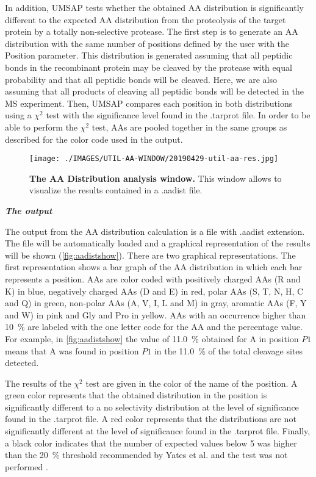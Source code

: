 In addition, UMSAP tests whether the obtained AA distribution is significantly different to the expected AA distribution from the proteolysis of the target protein by a totally non-selective protease. The first step is to generate an AA distribution with the same number of positions defined by the user with the Position parameter. This distribution is generated assuming that all peptidic bonds in the recombinant protein may be cleaved by the protease with equal probability and that all peptidic bonds will be cleaved. Here, we are also assuming that all products of cleaving all peptidic bonds will be detected in the MS experiment. Then, UMSAP compares each position in both distributions using a $\chi^2$ test with the significance level found in the .tarprot file. In order to be able to perform the $\chi^2$ test, AAs are pooled together in the same groups as described for the color code used in the output.    

\begin{figure}[h]
	\centering
	\texttt{[image: ./IMAGES/UTIL-AA-WINDOW/20190429-util-aa-res.jpg]}	    
	\caption[The AA Distribution analysis window]{\textbf{The AA Distribution analysis window.} This window allows to visualize the results contained in a .aadist file.}
	\label{fig:aadistshow}
	\vspace{-5pt} 	
\end{figure}

\textit{\textbf{The output}} 

The output from the AA distribution calculation is a file with .aadist extension. The file will be automatically loaded and a graphical representation of the results will be shown (\autoref{fig:aadistshow}). There are two graphical representations. The first representation shows a bar graph of the AA distribution in which each bar represents a position. AAs are color coded with positively charged AAs (R and K) in blue, negatively charged AAs (D and E) in red, polar AAs (S, T, N, H, C and Q) in green, non-polar AAs (A, V, I, L and M) in gray, aromatic AAs (F, Y and W) in pink and Gly and Pro in yellow. AAs with an occurrence higher than \SI{10}{\percent} are labeled with the one letter code for the AA and the percentage value. For example, in \autoref{fig:aadistshow} the value of \SI{11.0}{\percent} obtained for A in position \(P1\) means that A was found in position \(P1\) in the \SI{11.0}{\percent} of the total cleavage sites detected. 

The results of the $\chi^2$ test are given in the color of the name of the position. A green color represents that the obtained distribution in the position is significantly different to a no selectivity distribution at the level of significance found in the .tarprot file. A red color represents that the distributions are not significantly different at the level of significance found in the .tarprot file. Finally, a black color indicates that the number of expected values below 5 was higher than the \SI{20}{\percent} threshold recommended by Yates et al. and the test was not performed \cite{Yates1999}. 

